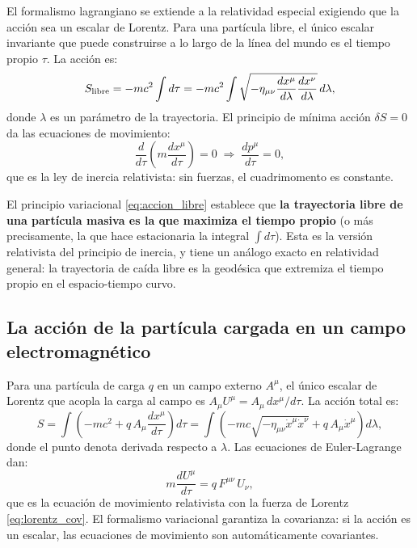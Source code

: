 El formalismo lagrangiano se extiende a la relatividad especial exigiendo que la acción sea un escalar de Lorentz. Para una partícula libre, el único escalar invariante que puede construirse a lo largo de la línea del mundo es el tiempo propio $\tau$. La acción es:
\begin{equation}
  S_{\rm libre} = -mc^2 \int d\tau = -mc^2 \int \sqrt{-\eta_{\mu\nu}\frac{dx^\mu}{d\lambda}\frac{dx^\nu}{d\lambda}}\, d\lambda,
  \label{eq:accion_libre}
\end{equation}
donde $\lambda$ es un parámetro de la trayectoria. El principio de mínima acción $\delta S = 0$ da las ecuaciones de movimiento:
\[
  \frac{d}{d\tau}\left(m\frac{dx^\mu}{d\tau}\right) = 0 \;\Rightarrow\; \frac{dp^\mu}{d\tau} = 0,
\]
que es la ley de inercia relativista: sin fuerzas, el cuadrimomento es constante.

\begin{importante}
El principio variacional \eqref{eq:accion_libre} establece que \textbf{la trayectoria libre de una partícula masiva es la que maximiza el tiempo propio} (o más precisamente, la que hace estacionaria la integral $\int d\tau$). Esta es la versión relativista del principio de inercia, y tiene un análogo exacto en relatividad general: la trayectoria de caída libre es la geodésica que extremiza el tiempo propio en el espacio-tiempo curvo.
\end{importante}

\subsection{La acción de la partícula cargada en un campo electromagnético}

Para una partícula de carga $q$ en un campo externo $A^\mu$, el único escalar de Lorentz que acopla la carga al campo es $A_\mu U^\mu = A_\mu\, dx^\mu/d\tau$. La acción total es:
\begin{equation}
  S = \int\!\left(-mc^2 + q\,A_\mu\frac{dx^\mu}{d\tau}\right) d\tau
  = \int\!\left(-mc\sqrt{-\eta_{\mu\nu}\dot{x}^\mu\dot{x}^\nu} + q\,A_\mu\dot{x}^\mu\right) d\lambda,
  \label{eq:accion_cargada}
\end{equation}
donde el punto denota derivada respecto a $\lambda$. Las ecuaciones de Euler-Lagrange dan:
\begin{equation}
  m\frac{dU^\mu}{d\tau} = q\,F^{\mu\nu}\,U_\nu,
  \label{eq:EOM_cargada}
\end{equation}
que es la ecuación de movimiento relativista con la fuerza de Lorentz \eqref{eq:lorentz_cov}. El formalismo variacional garantiza la covarianza: si la acción es un escalar, las ecuaciones de movimiento son automáticamente covariantes.

